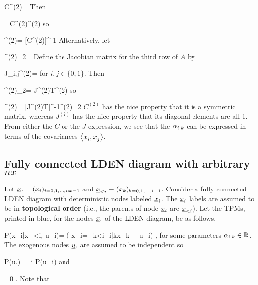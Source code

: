 \beq
C^{(2)}=
\eeq
Then

\beq
{}=C^{(2)}\alp^{(2)}
\eeq
so


\beq
\alp^{(2)}=
[C^{(2)}]^{-1}
\eeq
Alternatively, let

\beq
\nabla^{(2)}\rvx_2=
\eeq
Define the 
Jacobian matrix for the third row of $A$ by

\beq
J_{i,j}^{(2)}=
\eeq
for $i,j\in\{0,1\}$.
Then

\beq
\nabla^{(2)}\rvx_2=
J^{(2)T}\alp^{(2)}
\eeq
so

\beq
\alp^{(2)}=
[J^{(2)T}]^{-1}\nabla^{(2)}\rvx_2
\eeq
$C^{(2)}$ has the nice property that
it is a symmetric matrix, whereas
$J^{(2)}$ has the nice property
that its diagonal elements are all 1.
From either the $C$ or the $J$ expression,
we see that the $\alpha_{i|k}$
can be expressed in terms of the
covariances $\left\langle{\underline{x}}_i, {\underline{x}}_j\right\rangle$.



\subsection{Fully
connected 
LDEN diagram with arbitrary $nx$} 

Let ${\underline{x}}.=(x_i)_{i=0, 1,
 \ldots, nx-1}$
and ${\underline{x}}_{<i}=
(x_k)_{k=0, 1, \ldots, i-1}$.
Consider
a fully connected
LDEN diagram
with  deterministic nodes labeled
${\underline{x}}_i$.
The ${\underline{x}}_i$ labels 
are assumed
to be in {\bf topological order}
(i.e., the parents of
node ${\underline{x}}_i$ are ${\underline{x}}_{<i}$).
Let the TPMs,
printed in blue, for the nodes ${\underline{x}}.$
of the 
LDEN diagram, be
as follows.

\beq\color{blue}
P(x_i|x_{<i}, u_i)=
\indi(
x_i=\sum_{k<i}\alp_{i|k}x_k
 + u_i)
\;,
\label{eq-linear-pa-tpm}
\eeq
for some parameters $\alpha_{i|k}\in { \mathbb{R}}$.
The exogenous 
nodes ${\underline{u}}.$  are assumed
to be independent so

\beq
P(u.)=\prod_i P(u_i)
\eeq
and

\beq
{}=0
\;.
\eeq
Note that

